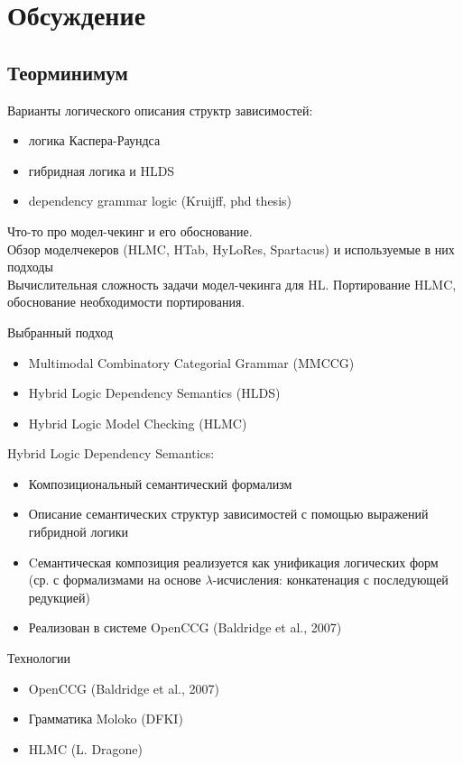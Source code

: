 \documentclass[a4paper,12pt]{article}
\begin{document}
\section{Обсуждение}

\subsection{Теорминимум}

Варианты логического описания структр зависимостей:
\begin{itemize}
    \item логика Каспера-Раундса
	\item гибридная логика и HLDS
	\item dependency grammar logic (Kruijff, phd thesis)
\end{itemize}
 
\bigskip

Что-то про модел-чекинг и его обоснование.\\
Обзор моделчекеров (HLMC, HTab, HyLoRes, Spartacus) и используемые в них подходы\\
Вычислительная сложность задачи модел-чекинга для HL.
Портирование HLMC, обоснование необходимости портирования.\\

\bigskip

Выбранный подход
\begin{itemize}
	\item Multimodal Combinatory Categorial Grammar (MMCCG)
	\item Hybrid Logic Dependency Semantics (HLDS)
	\item Hybrid Logic Model Checking (HLMC)
\end{itemize}

Hybrid Logic Dependency Semantics:\\
\begin{itemize}
	\item Композициональный семантический формализм 
	\item Описание семантических структур зависимостей с помощью выражений гибридной логики
	\item Cемантическая композиция реализуется как унификация логических форм (ср. с формализмами на основе $\lambda$-исчисления: конкатенация с последующей редукцией)
	\item Реализован в системе OpenCCG (Baldridge et al., 2007)
\end{itemize}

Технологии\\
\begin{itemize}
	\item OpenCCG (Baldridge et al., 2007)
	\item Грамматика Moloko (DFKI)
	\item HLMC (L. Dragone)
\end{itemize}
\end{document}
